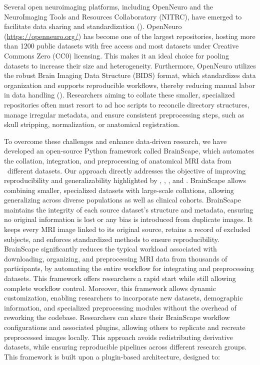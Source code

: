 Several open neuroimaging platforms, including OpenNeuro and the NeuroImaging Tools and Resources Collaboratory (NITRC),
have emerged to facilitate data sharing and standardization (\cite{markiewicz2021openneuro, buccigrossi2008neuroimaging}).
OpenNeuro (\url{https://openneuro.org/}) has become one of the largest repositories, hosting more than 1200 public 
datasets with free access and most datasets under Creative Commons Zero (CC0) licensing. This makes it an ideal choice for 
pooling datasets to increase their size and heterogeneity. 
Furthermore, OpenNeuro utilizes the robust Brain Imaging Data Structure (BIDS) format, which standardizes data 
organization and supports reproducible workflows, thereby reducing manual labor in data handling (\cite{markiewicz2021openneuro}). 
Researchers aiming to collate these smaller, specialized repositories often must 
resort to ad hoc scripts to reconcile directory structures, manage irregular metadata, and ensure consistent preprocessing 
steps, such as skull stripping, normalization, or anatomical registration.

To overcome these challenges and enhance data-driven research, we have developed an open-source Python framework called BrainScape, 
which automates the collation, integration, and preprocessing of anatomical MRI data from \NumDatasets\ different datasets. 
Our approach directly addresses the objective of improving reproducibility and 
generalizability highlighted by \cite{marek2024replicability}, \cite{yang2024limits}, \cite{kiar2024experimental}, and \cite{adkinson2024brain}.
BrainScape allows combining smaller, specialized datasets with large-scale collations, 
allowing generalizing across diverse populations as well as clinical cohorts. 
BrainScape maintains the integrity of each source dataset's structure and metadata, ensuring no original information is lost or any bias is introduced from duplicate images. 
It keeps every MRI image linked to its original source, retains a record of excluded subjects, 
and enforces standardized methods to ensure reproducibility. 
BrainScape significantly reduces the typical workload associated with downloading, 
organizing, and preprocessing MRI data from thousands of participants, 
by automating the entire workflow for integrating and preprocessing datasets. 
This framework offers researchers a rapid start while still allowing complete workflow control.
Moreover, this framework allows dynamic customization, enabling researchers to incorporate new datasets, demographic information, 
and specialized preprocessing modules without the overhead of reworking the codebase.
Researchers can share their BrainScape workflow configurations and associated plugins, 
allowing others to replicate and recreate preprocessed images locally. 
This approach avoids redistributing derivative datasets, 
while ensuring reproducible pipelines across different research groups. 
This framework is built upon a plugin-based architecture, designed to:

